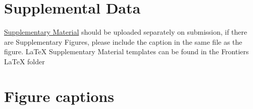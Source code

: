 \documentclass{frontiersSCNS}
\begin{document}
\section*{Supplemental Data}

\href{http://home.frontiersin.org/about/author-guidelines#SupplementaryMaterial}{Supplementary Material}
should be uploaded separately on submission, if there are Supplementary
Figures, please include the caption in the same file as the figure.
LaTeX Supplementary Material templates can be found in the Frontiers
LaTeX folder



\section*{Figure captions}
\end{document}
